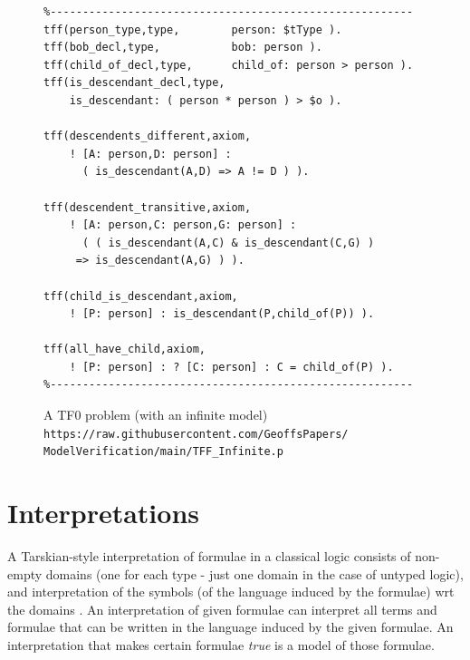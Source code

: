 \documentclass[letterpaper]{article}
\begin{document}
\begin{figure}[htbp]
\scriptsize
{}
\begin{verbatim}
%--------------------------------------------------------
tff(person_type,type,        person: $tType ).
tff(bob_decl,type,           bob: person ).
tff(child_of_decl,type,      child_of: person > person ).
tff(is_descendant_decl,type, 
    is_descendant: ( person * person ) > $o ).

tff(descendents_different,axiom,
    ! [A: person,D: person] : 
      ( is_descendant(A,D) => A != D ) ).

tff(descendent_transitive,axiom,
    ! [A: person,C: person,G: person] :
      ( ( is_descendant(A,C) & is_descendant(C,G) ) 
     => is_descendant(A,G) ) ).

tff(child_is_descendant,axiom,
    ! [P: person] : is_descendant(P,child_of(P)) ).

tff(all_have_child,axiom,
    ! [P: person] : ? [C: person] : C = child_of(P) ).
%--------------------------------------------------------
\end{verbatim}
\caption{A TF0 problem (with an infinite model)\\
{\scriptsize {\tt https://raw.githubusercontent.com/GeoffsPapers/\\
ModelVerification/main/TFF\_Infinite.p}}}
\label{TF0InfiniteProblem}
\end{figure}


\section{Interpretations}
\label{Interpretations}

A Tarskian-style \cite{TV56} interpretation of formulae in a classical logic consists of non-empty 
domains (one for each type - just one domain in the case of untyped logic), and interpretation of 
the symbols (of the language induced by the formulae) wrt the domains \cite{Hun96}.
An interpretation of given formulae can interpret all terms and formulae that can be written in 
the language induced by the given formulae.
An interpretation that makes certain formulae {\em true} is a model of those formulae.
\end{document}
